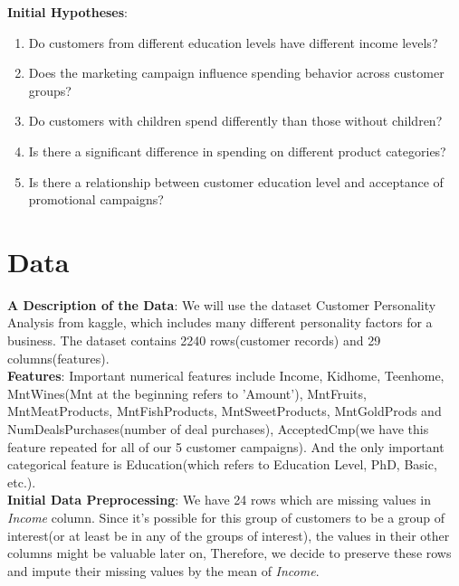\documentclass[a4paper,12pt]{article}
\begin{document}
\newpage
\noindent \textbf{Initial Hypotheses}: 
\begin{enumerate}
    \item Do customers from different education levels have different income levels?
    \item Does the marketing campaign influence spending behavior across customer
    groups?
    \item Do customers with children spend differently than those without children?
    \item Is there a significant difference in spending on different product categories?
    \item Is there a relationship between customer education level and acceptance
    of promotional campaigns?
\end{enumerate} 


\section*{Data}
\noindent \textbf{A Description of the Data}: We will use the dataset Customer Personality Analysis from kaggle, which includes many different personality factors for a business. 
The dataset contains 2240 rows(customer records) and 29 columns(features). \\

\noindent \textbf{Features}: Important numerical features include Income, Kidhome, Teenhome, MntWines(Mnt at the beginning refers to 'Amount'), MntFruits, MntMeatProducts, 
MntFishProducts, MntSweetProducts, MntGoldProds and NumDealsPurchases(number of deal purchases), AcceptedCmp(we have this feature repeated for all of our 5 customer campaigns). 
And the only important categorical feature is Education(which refers to Education Level, PhD, Basic, etc.). \\ 

\noindent \textbf{Initial Data Preprocessing}: We have 24 rows which are missing values in \textit{Income} column. Since it's possible for this group of customers to be a group of interest(or at least be in any of the groups of interest), 
the values in their other columns might be valuable later on, Therefore, we decide to preserve these rows and impute their missing values by the mean of \textit{Income}. \\ 
\end{document}

